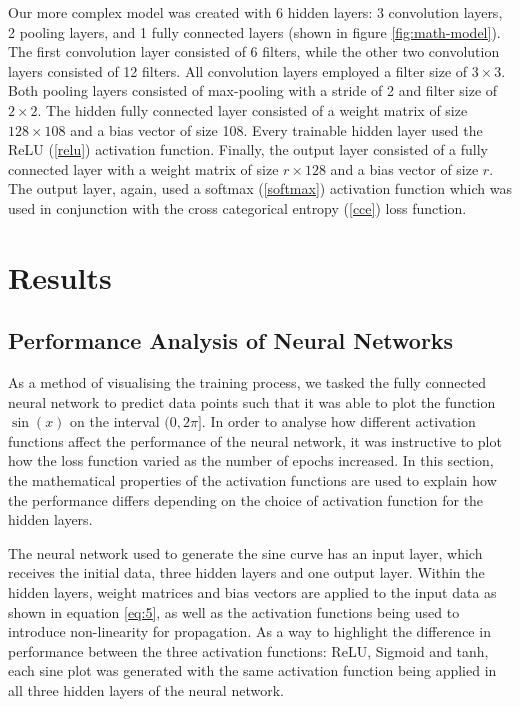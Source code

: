 \documentclass[twocolumn,pra,floatfix]{revtex4-2}
\begin{document}
                Our more complex model was created with 6 hidden layers: 3 convolution layers, 2 pooling layers, and 1 fully connected layers (shown in figure \ref{fig:math-model}). The first convolution layer consisted of 6 filters, while the other two convolution layers consisted of 12 filters. All convolution layers employed a filter size of $3 \times 3$. Both pooling layers consisted of max-pooling with a stride of 2 and filter size of $2 \times 2$. The hidden fully connected layer consisted of a weight matrix of size $128 \times 108$ and a bias vector of size 108. Every trainable hidden layer used the ReLU (\ref{relu}) activation function. Finally, the output layer consisted of a fully connected layer with a weight matrix of size $r \times 128$ and a bias vector of size $r$. The output layer, again, used a softmax (\ref{softmax}) activation function which was used in conjunction with the cross categorical entropy (\ref{cce}) loss function. 
            
    \section{Results}

        \subsection{Performance Analysis of Neural Networks}

            As a method of visualising the training process, we tasked the fully connected neural network to predict data points such that it was able to plot the function $\sin(x)$ on the interval $(0, 2\pi]$. In order to analyse how different activation functions affect the performance of the neural network, it was instructive to plot how the loss function varied as the number of epochs increased. In this section, the mathematical properties of the activation functions are used to explain how the performance differs depending on the choice of activation function for the hidden layers.
            
            The neural network used to generate the sine curve has an input layer, which receives the initial data, three hidden layers and one output layer. Within the hidden layers, weight matrices and bias vectors are applied to the input data as shown in equation \ref{eq:5}, as well as the activation functions being used to introduce non-linearity for propagation. As a way to highlight the difference in performance between the three activation functions: ReLU, Sigmoid and tanh, each sine plot was generated with the same activation function being applied in all three hidden layers of the neural network.
\end{document}
